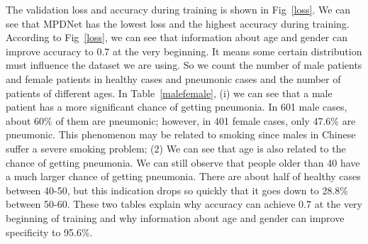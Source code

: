 \documentclass[journal]{IEEEtran}
\begin{document}
The validation loss and accuracy during training is shown in Fig~\ref{loss}. We can see that MPDNet has the lowest loss and the highest accuracy during training.
According to Fig~\ref{loss}, we can see that information about age and gender can improve accuracy to 0.7 at the very beginning. It means some certain distribution must influence the dataset we are using. 
So we count the number of male patients and female patients in healthy cases and pneumonic cases and the number of patients of different ages. 
In Table~\ref{malefemale}, (i) we can see that a male patient has a more significant chance of getting pneumonia. In 601 male cases, about 60\% of them are pneumonic; however, in 401 female cases, only 47.6\% are pneumonic. This phenomenon may be related to smoking since males in Chinese suffer a severe smoking problem; (2) We can see that age is also related to the chance of getting pneumonia. We can still observe that people older than 40 have a much larger chance of getting pneumonia. There are about half of healthy cases between 40-50, but this indication drops so quickly that it goes down to 28.8\% between 50-60. These two tables explain why accuracy can achieve 0.7 at the very beginning of training and why information about age and gender can improve specificity to 95.6\%.
\end{document}
